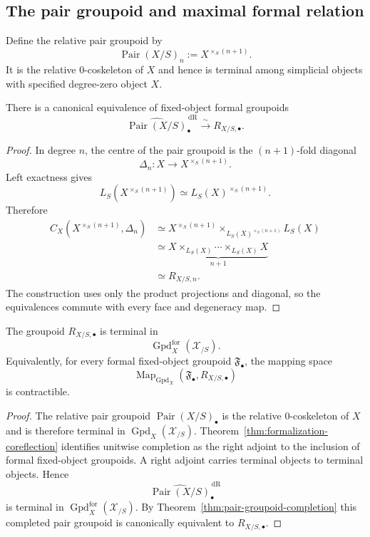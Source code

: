 \subsection{The pair groupoid and maximal formal relation}

Define the relative pair groupoid by
\[
    \operatorname{Pair}(X/S)_n
    :=
    X^{\times_S(n+1)}.
\]
It is the relative $0$-coskeleton of $X$ and hence is terminal among
simplicial objects with specified degree-zero object $X$.

\begin{theorem}
\label{thm:pair-groupoid-completion}
There is a canonical equivalence of fixed-object formal groupoids
\[
    \widehat{\operatorname{Pair}(X/S)}^{\,\mathrm{dR}}_\bullet
    \xrightarrow{\sim}
    R_{X/S,\bullet}.
\]
\end{theorem}

\begin{proof}
In degree $n$, the centre of the pair groupoid is the $(n+1)$-fold diagonal
\[
    \Delta_n:X\longrightarrow X^{\times_S(n+1)}.
\]
Left exactness gives
\[
    L_S\!\left(X^{\times_S(n+1)}\right)
    \simeq
    L_S(X)^{\times_S(n+1)}.
\]
Therefore
\[
\begin{aligned}
    C_X\!\left(X^{\times_S(n+1)},\Delta_n\right)
    &\simeq
    X^{\times_S(n+1)}
    \times_{L_S(X)^{\times_S(n+1)}}
    L_S(X)\\
    &\simeq
    \underbrace{
    X\times_{L_S(X)}\cdots\times_{L_S(X)}X
    }_{n+1}\\
    &\simeq
    R_{X/S,n}.
\end{aligned}
\]
The construction uses only the product projections and diagonal, so the
equivalences commute with every face and degeneracy map.
\end{proof}

\begin{theorem}
\label{thm:maximal-formal-terminal}
The groupoid $R_{X/S,\bullet}$ is terminal in
\[
    \operatorname{Gpd}^{\mathrm{for}}_X(\mathcal X_{/S}).
\]
Equivalently, for every formal fixed-object groupoid $\mathfrak F_\bullet$,
the mapping space
\[
    \operatorname{Map}_{\operatorname{Gpd}_X}
    \left(
        \mathfrak F_\bullet,
        R_{X/S,\bullet}
    \right)
\]
is contractible.
\end{theorem}

\begin{proof}
The relative pair groupoid
$\operatorname{Pair}(X/S)_\bullet$ is the relative $0$-coskeleton of $X$ and
is therefore terminal in
$\operatorname{Gpd}_X(\mathcal X_{/S})$.
Theorem~\ref{thm:formalization-coreflection} identifies unitwise completion
as the right adjoint to the inclusion of formal fixed-object groupoids.
A right adjoint carries terminal objects to terminal objects.  Hence
\[
    \widehat{\operatorname{Pair}(X/S)}^{\,\mathrm{dR}}_\bullet
\]
is terminal in
$\operatorname{Gpd}^{\mathrm{for}}_X(\mathcal X_{/S})$.
By Theorem~\ref{thm:pair-groupoid-completion} this completed pair groupoid is
canonically equivalent to $R_{X/S,\bullet}$.
\end{proof}


